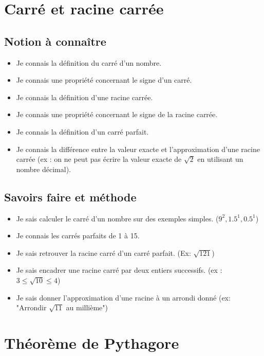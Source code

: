 \documentclass[12pt,a4paper]{article}
\begin{document}
\renewcommand{\labelitemi}{\textbullet}



\section{Carré et racine carrée}
\subsection{Notion à connaître}
\begin{itemize}
    \item Je connais la définition du carré d'un nombre.
    \item Je connais une propriété concernant le signe d'un carré.
    \item Je connais la définition d'une racine carrée.
    \item Je connais une propriété concernant le signe de la racine carrée.
    \item Je connais la définition d'un carré parfait.
    \item Je connais la différence entre la valeur exacte et l'approximation
        d'une racine carrée (ex : on ne peut pas écrire la valeur exacte de
        $\sqrt{2}$ en utilisant un nombre décimal).
\end{itemize}

\subsection{Savoirs faire et méthode}
\begin{itemize}
    \item Je sais calculer le carré d'un nombre sur des exemples
        simples. ($9^2, 1.5^1, 0.5^1$)
    \item Je connais les carrés parfaits de 1 à 15.
    \item Je sais retrouver la racine carré d'un carré parfait. (Ex: $\sqrt{121}$)
    \item Je sais encadrer une racine carré par deux entiers successifs. (ex :
        $3\le\sqrt{10}\le4$)
    \item Je sais donner l'approximation d'une racine à un arrondi donné (ex:
        "Arrondir $\sqrt{11}$ au millième")
\end{itemize}

\section{Théorème de Pythagore}
\end{document}
